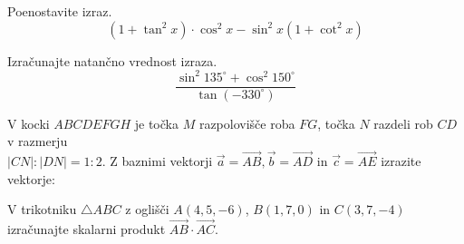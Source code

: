 \documentclass[addpoints]{exam}
\begin{document}
\begin{questions}


    \question[4]
    Poenostavite izraz. 
    $$ \left(1 + \tan^2x\right)\cdot\cos^2x-\sin^2x(1+\cot^2x)$$

    \begin{solution}[6.5cm]
       
    \end{solution}



    \question[4]
    Izračunajte natančno vrednost izraza. 
    $$ \dfrac{\sin^2{135^\circ}+\cos^2{150^\circ}}{\tan\left(-330^\circ\right)}$$

    \begin{solution}[6cm]
       
    \end{solution}


\newpage

    \question
    V kocki $ABCDEFGH$ je točka $M$ razpolovišče roba $FG$, točka $N$ razdeli rob $CD$ v razmerju \\ $|CN|:|DN|=1:2$.
    Z baznimi vektorji $\overrightarrow{a}=\overrightarrow{AB}, \overrightarrow{b}=\overrightarrow{AD}$ in $\overrightarrow{c}=\overrightarrow{AE}$ izrazite vektorje: 

    \begin{solution}[5cm]

    \end{solution}

    

    

    \question[3]
    V trikotniku $\triangle ABC$ z oglišči $A(4,5,-6)$, $B(1,7,0)$ in $C(3,7,-4)$ izračunajte skalarni produkt $\overrightarrow{AB}\cdot\overrightarrow{AC}$.


\end{questions}
\end{document}
